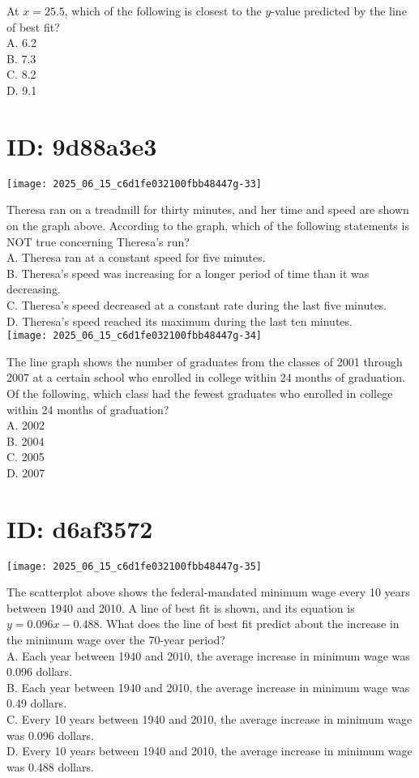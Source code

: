 At $x=25.5$, which of the following is closest to the $y$-value predicted by the line of best fit?\\
A. 6.2\\
B. 7.3\\
C. 8.2\\
D. 9.1

\section*{ID: 9d88a3e3}
\begin{center}
\texttt{[image: 2025\_06\_15\_c6d1fe032100fbb48447g-33]}
\end{center}

Theresa ran on a treadmill for thirty minutes, and her time and speed are shown on the graph above. According to the graph, which of the following statements is NOT true concerning Theresa's run?\\
A. Theresa ran at a constant speed for five minutes.\\
B. Theresa's speed was increasing for a longer period of time than it was decreasing.\\
C. Theresa's speed decreased at a constant rate during the last five minutes.\\
D. Theresa's speed reached its maximum during the last ten minutes.\\
\texttt{[image: 2025\_06\_15\_c6d1fe032100fbb48447g-34]}

The line graph shows the number of graduates from the classes of 2001 through 2007 at a certain school who enrolled in college within 24 months of graduation. Of the following, which class had the fewest graduates who enrolled in college within 24 months of graduation?\\
A. 2002\\
B. 2004\\
C. 2005\\
D. 2007

\section*{ID: d6af3572}
\begin{center}
\texttt{[image: 2025\_06\_15\_c6d1fe032100fbb48447g-35]}
\end{center}

The scatterplot above shows the federal-mandated minimum wage every 10 years between 1940 and 2010. A line of best fit is shown, and its equation is $y=0.096 x-0.488$. What does the line of best fit predict about the increase in the minimum wage over the 70-year period?\\
A. Each year between 1940 and 2010, the average increase in minimum wage was 0.096 dollars.\\
B. Each year between 1940 and 2010, the average increase in minimum wage was 0.49 dollars.\\
C. Every 10 years between 1940 and 2010, the average increase in minimum wage was 0.096 dollars.\\
D. Every 10 years between 1940 and 2010, the average increase in minimum wage was 0.488 dollars.

